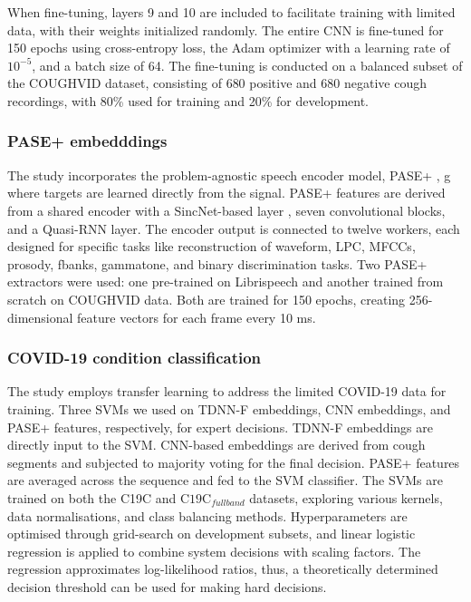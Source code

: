 When fine-tuning, layers 9 and 10 are included to facilitate training with limited data, with their weights initialized randomly. The entire \ac{CNN} is fine-tuned for 150 epochs using cross-entropy loss, the Adam optimizer with a learning rate of $10^{-5}$, and a batch size of 64. The fine-tuning is conducted on a balanced subset of the COUGHVID dataset, consisting of 680 positive and 680 negative cough recordings, with 80\% used for training and 20\% for development.

\subsubsection{PASE+ embedddings}
The study incorporates the problem-agnostic speech encoder model, \ac{PASE}+ \cite{Pascual2019,Ravanelli2020}, g where targets are learned directly from the
signal. \ac{PASE}+ features are derived from a shared encoder with a SincNet-based layer \cite{Sincnet}, seven convolutional blocks, and a Quasi-\ac{RNN} layer. The encoder output is connected to twelve workers, each designed for specific tasks like reconstruction of waveform, \ac{LPC}, \acp{MFCC}, prosody, \ac{fbanks}, gammatone, and binary discrimination tasks. Two \ac{PASE}+ extractors were used: one pre-trained on Librispeech and another trained from scratch on COUGHVID data. Both are trained for 150 epochs, creating 256-dimensional feature vectors for each frame every 10 ms.
\subsubsection{COVID-19 condition classification}
The study employs transfer learning to address the limited COVID-19 data for training. Three \acp{SVM} we used on \ac{TDNN-F} embeddings, \ac{CNN} embeddings, and \ac{PASE}+ features, respectively, for expert decisions. \ac{TDNN-F} embeddings are directly input to the \ac{SVM}. \ac{CNN}-based embeddings are derived from cough segments and subjected to majority voting for the final decision. \ac{PASE}+ features are averaged across the sequence and fed to the \ac{SVM} classifier. The \acp{SVM} are trained on both the C19C and $\text{C19C}_{fullband}$ datasets, exploring various kernels, data normalisations, and class balancing methods. Hyperparameters are optimised through grid-search on development subsets, and linear logistic regression is applied to combine system decisions with scaling factors. The regression approximates log-likelihood ratios, thus, a theoretically determined decision threshold can be used for making hard decisions.
